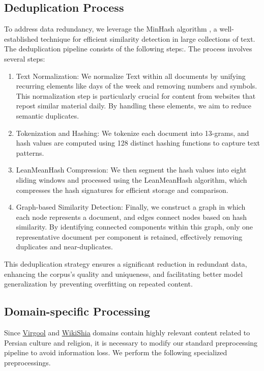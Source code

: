 \subsection{Deduplication Process}
To address data redundancy, we leverage the MinHash algorithm \citep{broder1997minhash}, a well-established technique for efficient similarity detection in large collections of text. The deduplication pipeline consists of the following steps:\citep{broder1997minhash}. The process involves several steps:
\begin{enumerate}
    \item Text Normalization: We normalize Text within all documents by unifying recurring elements like days of the week and removing numbers and symbols. This normalization step is particularly crucial for content from websites that repost similar material daily. By handling these elements, we aim to reduce semantic duplicates.

    \item Tokenization and Hashing: We tokenize each document into 13-grams, and hash values are computed using 128 distinct hashing functions to capture text patterns.

    \item LeanMeanHash Compression: We then segment the hash values into eight sliding windows and processed using the LeanMeanHash algorithm, which compresses the hash signatures for efficient storage and comparison.

    \item Graph-based Similarity Detection: Finally, we construct a graph in which each node represents a document, and edges connect nodes based on hash similarity. By identifying connected components within this graph, only one representative document per component is retained, effectively removing duplicates and near-duplicates.
\end{enumerate}

This deduplication strategy ensures a significant reduction in redundant data, enhancing the corpus's quality and uniqueness, and facilitating better model generalization by preventing overfitting on repeated content.

\subsection{Domain-specific Processing}
Since \href{https://virgool.io/}{Virgool} and \href{https://en.wikishia.net/}{WikiShia} domains contain highly relevant content related to Persian culture and religion, it is  necessary to modify our standard preprocessing pipeline to avoid information loss. We perform the following specialized preprocessings.

